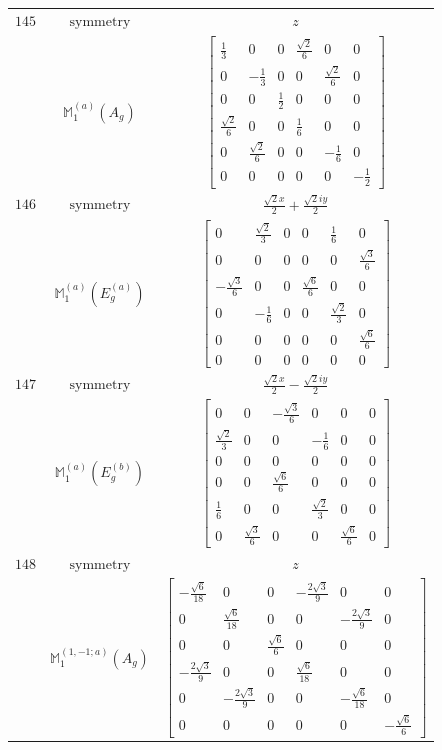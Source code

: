 \documentclass[fleqn,8pt,landscape]{jsarticle}
\begin{document}
\begin{longtable}{ccc}
$ 145 $ & $ \text{symmetry} $ & $ z $ \\
$  $ & $ \mathbb{M}_{1}^{(a)}(A_{g}) $ & $ \begin{bmatrix} \frac{1}{3} & 0 & 0 & \frac{\sqrt{2}}{6} & 0 & 0 \\ 0 & - \frac{1}{3} & 0 & 0 & \frac{\sqrt{2}}{6} & 0 \\ 0 & 0 & \frac{1}{2} & 0 & 0 & 0 \\ \frac{\sqrt{2}}{6} & 0 & 0 & \frac{1}{6} & 0 & 0 \\ 0 & \frac{\sqrt{2}}{6} & 0 & 0 & - \frac{1}{6} & 0 \\ 0 & 0 & 0 & 0 & 0 & - \frac{1}{2} \end{bmatrix} $ \\ \hline
$ 146 $ & $ \text{symmetry} $ & $ \frac{\sqrt{2} x}{2} + \frac{\sqrt{2} i y}{2} $ \\
$  $ & $ \mathbb{M}_{1}^{(a)}(E_{g}^{(a)}) $ & $ \begin{bmatrix} 0 & \frac{\sqrt{2}}{3} & 0 & 0 & \frac{1}{6} & 0 \\ 0 & 0 & 0 & 0 & 0 & \frac{\sqrt{3}}{6} \\ - \frac{\sqrt{3}}{6} & 0 & 0 & \frac{\sqrt{6}}{6} & 0 & 0 \\ 0 & - \frac{1}{6} & 0 & 0 & \frac{\sqrt{2}}{3} & 0 \\ 0 & 0 & 0 & 0 & 0 & \frac{\sqrt{6}}{6} \\ 0 & 0 & 0 & 0 & 0 & 0 \end{bmatrix} $ \\ \hline
$ 147 $ & $ \text{symmetry} $ & $ \frac{\sqrt{2} x}{2} - \frac{\sqrt{2} i y}{2} $ \\
$  $ & $ \mathbb{M}_{1}^{(a)}(E_{g}^{(b)}) $ & $ \begin{bmatrix} 0 & 0 & - \frac{\sqrt{3}}{6} & 0 & 0 & 0 \\ \frac{\sqrt{2}}{3} & 0 & 0 & - \frac{1}{6} & 0 & 0 \\ 0 & 0 & 0 & 0 & 0 & 0 \\ 0 & 0 & \frac{\sqrt{6}}{6} & 0 & 0 & 0 \\ \frac{1}{6} & 0 & 0 & \frac{\sqrt{2}}{3} & 0 & 0 \\ 0 & \frac{\sqrt{3}}{6} & 0 & 0 & \frac{\sqrt{6}}{6} & 0 \end{bmatrix} $ \\ \hline
$ 148 $ & $ \text{symmetry} $ & $ z $ \\
$  $ & $ \mathbb{M}_{1}^{(1,-1;a)}(A_{g}) $ & $ \begin{bmatrix} - \frac{\sqrt{6}}{18} & 0 & 0 & - \frac{2 \sqrt{3}}{9} & 0 & 0 \\ 0 & \frac{\sqrt{6}}{18} & 0 & 0 & - \frac{2 \sqrt{3}}{9} & 0 \\ 0 & 0 & \frac{\sqrt{6}}{6} & 0 & 0 & 0 \\ - \frac{2 \sqrt{3}}{9} & 0 & 0 & \frac{\sqrt{6}}{18} & 0 & 0 \\ 0 & - \frac{2 \sqrt{3}}{9} & 0 & 0 & - \frac{\sqrt{6}}{18} & 0 \\ 0 & 0 & 0 & 0 & 0 & - \frac{\sqrt{6}}{6} \end{bmatrix} $ \\ \hline

\end{longtable}
\end{document}
